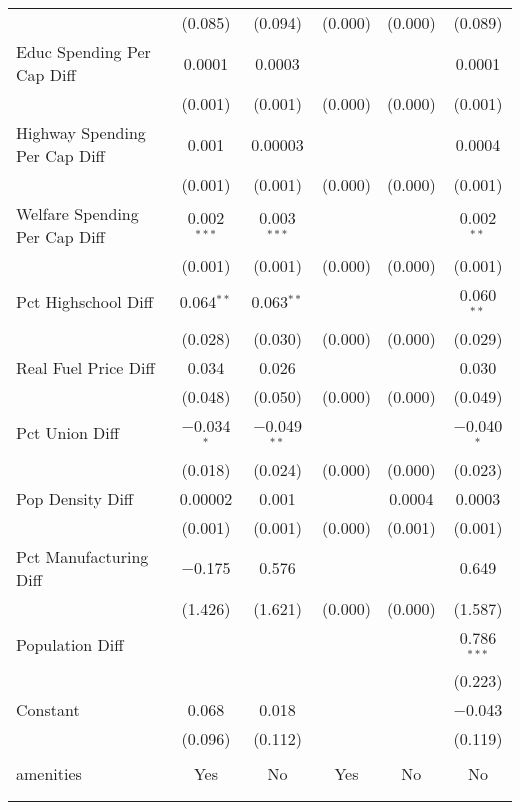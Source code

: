 \begin{table}[!htbp]
\begin{tabular}{@{\extracolsep{5pt}}lccccc}
  & (0.085) & (0.094) & (0.000) & (0.000) & (0.089) \\ 
  Educ Spending Per Cap Diff & 0.0001 & 0.0003 &  &  & 0.0001 \\ 
  & (0.001) & (0.001) & (0.000) & (0.000) & (0.001) \\ 
  Highway Spending Per Cap Diff & 0.001 & 0.00003 &  &  & 0.0004 \\ 
  & (0.001) & (0.001) & (0.000) & (0.000) & (0.001) \\ 
  Welfare Spending Per Cap Diff & 0.002$^{***}$ & 0.003$^{***}$ &  &  & 0.002$^{**}$ \\ 
  & (0.001) & (0.001) & (0.000) & (0.000) & (0.001) \\ 
  Pct Highschool Diff & 0.064$^{**}$ & 0.063$^{**}$ &  &  & 0.060$^{**}$ \\ 
  & (0.028) & (0.030) & (0.000) & (0.000) & (0.029) \\ 
  Real Fuel Price Diff & 0.034 & 0.026 &  &  & 0.030 \\ 
  & (0.048) & (0.050) & (0.000) & (0.000) & (0.049) \\ 
  Pct Union Diff & $-$0.034$^{*}$ & $-$0.049$^{**}$ &  &  & $-$0.040$^{*}$ \\ 
  & (0.018) & (0.024) & (0.000) & (0.000) & (0.023) \\ 
  Pop Density Diff & 0.00002 & 0.001 &  & 0.0004 & 0.0003 \\ 
  & (0.001) & (0.001) & (0.000) & (0.001) & (0.001) \\ 
  Pct Manufacturing Diff & $-$0.175 & 0.576 &  &  & 0.649 \\ 
  & (1.426) & (1.621) & (0.000) & (0.000) & (1.587) \\ 
  Population Diff &  &  &  &  & 0.786$^{***}$ \\ 
  &  &  &  &  & (0.223) \\ 
  Constant & 0.068 & 0.018 &  &  & $-$0.043 \\ 
  & (0.096) & (0.112) &  &  & (0.119) \\ 
 \hline \\[-1.8ex] 
amenities & Yes & No & Yes & No & No \\ 
\hline \\[-1.8ex] 
\hline 
\hline \\[-1.8ex] 
\end{tabular} 
\end{table} 
